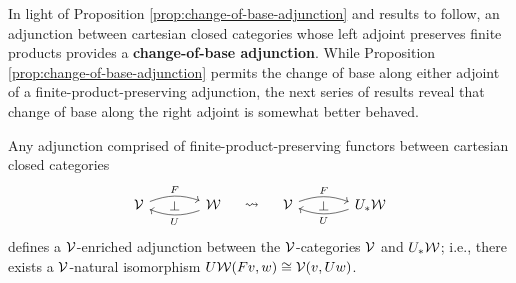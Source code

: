 In light of Proposition \ref{prop:change-of-base-adjunction} and results to follow, an adjunction between cartesian closed categories whose left adjoint preserves finite products provides a \textbf{change-of-base adjunction}. While Proposition \ref{prop:change-of-base-adjunction} permits the change of base along either adjoint of a finite-product-preserving adjunction, the next series of results reveal that change of base along the right adjoint is somewhat better behaved.


\begin{lem}\label{lem:enriched-cob-adjunction}
Any adjunction comprised of finite-product-preserving functors between cartesian closed categories
\[
\begin{tikzcd}[column sep=large]
\cV \arrow[r, bend left=20, "F"] \arrow[r, phantom, "\bot"] & \cW \arrow[l, bend left=20, "U"]  \arrow[r, phantom, "\rightsquigarrow"] & \cV \arrow[r, bend left=20, start anchor=20, end anchor=170, "F"] \arrow[r, phantom, "\bot"] & U_*\cW \arrow[l, bend left=20, start anchor=190, end anchor=-15, "U"]  \end{tikzcd}
\]
defines a ${\mathord{\mathcal{V}}}$-enriched adjunction between the ${\mathord{\mathcal{V}}}$-categories ${\mathord{\mathcal{V}}}$ and $U_*{\mathord{\mathcal{W}}}$; i.e., there exists a ${\mathord{\mathcal{V}}}$-natural isomorphism $U{\mathord{\mathcal{W}}}(Fv,w) \cong {\mathord{\mathcal{V}}}(v,Uw)$.
\end{lem}
